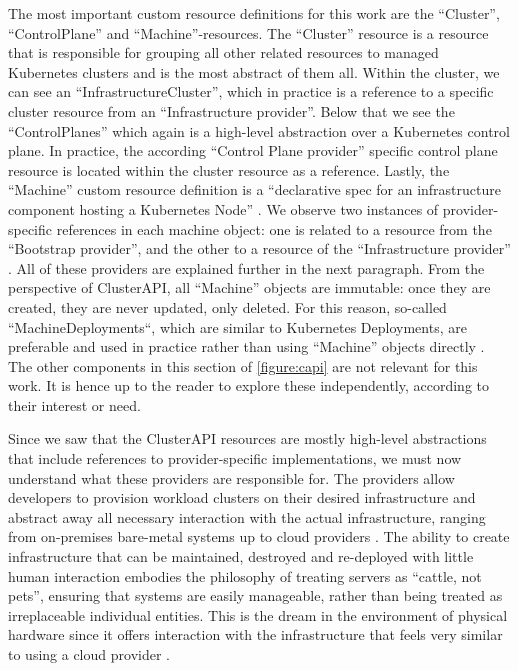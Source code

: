     The most important custom resource definitions for this work are the ``Cluster'', ``ControlPlane'' and ``Machine''-resources. The ``Cluster'' resource is a resource that is responsible for grouping all other related resources to managed Kubernetes clusters and is the most abstract of them all. Within the cluster, we can see an ``InfrastructureCluster'', which in practice is a reference to a specific cluster resource from an ``Infrastructure provider''. Below that we see the ``ControlPlanes'' which again is a high-level abstraction over a Kubernetes control plane. In practice, the according ``Control Plane provider'' specific control plane resource is located within the cluster resource as a reference. Lastly, the ``Machine'' custom resource definition is a ``declarative spec for an infrastructure component hosting a Kubernetes Node'' \cite{the_cluster_api_book}. We observe two instances of provider-specific references in each machine object: one is related to a resource from the ``Bootstrap provider'', and the other to a resource of the ``Infrastructure provider'' \cite{spectrocloud_2022}. All of these providers are explained further in the next paragraph. From the perspective of ClusterAPI, all ``Machine'' objects are immutable: once they are created, they are never updated, only deleted. For this reason, so-called ``MachineDeployments``, which are similar to Kubernetes Deployments, are preferable and used in practice rather than using ``Machine'' objects directly \cite{the_cluster_api_book}. The other components in this section of \autoref{figure:capi} are not relevant for this work. It is hence up to the reader to explore these independently, according to their interest or need.\newline

    Since we saw that the ClusterAPI resources are mostly high-level abstractions that include references to provider-specific implementations, we must now understand what these providers are responsible for. The providers allow developers to provision workload clusters on their desired infrastructure and abstract away all necessary interaction with the actual infrastructure, ranging from on-premises bare-metal systems up to cloud providers \cite{efficient_k8s_capi}. The ability to create infrastructure that can be maintained, destroyed and re-deployed with little human interaction embodies the philosophy of treating servers as ``cattle, not pets'', ensuring that systems are easily manageable, rather than being treated as irreplaceable individual entities. This is the dream in the environment of physical hardware since it offers interaction with the infrastructure that feels very similar to using a cloud provider \cite{cattle_not_pets}.

